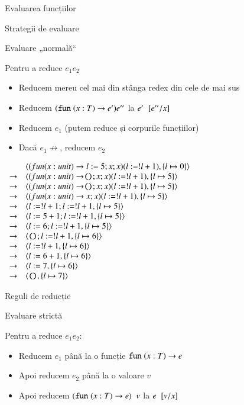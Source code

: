 \documentclass[xcolor=pdftex,romanian,colorlinks]{beamer}
\begin{document}
\begin{section}{Evaluarea funcțiilor}
\begin{subsection}{Strategii de evaluare}
\begin{frame}{Evaluare „normală“}
\begin{block}{}
Pentru a reduce $e_1 \mathrel{} e_2$
\begin{itemize}
\item Reducem mereu cel mai din stânga redex din cele de mai sus
\item Reducem $(\mathrel{\text{\ttfamily fun}} (x : T) \rightarrow e') e''$ la $e'\mathrel{}[e''/x]$
\item Reducem $e_1$ (putem reduce și corpurile funcțiilor)
\item Dacă $e_1\not\rightarrow$, reducem $e_2$
\end{itemize} 
\end{block}

\hfill {\small$\begin{array}{ll}
& {\langle{(fun (x : unit) \rightarrow l := 5 ; x ; x) (l := !l + 1), \{l \mapsto 0\}}\rangle} \\
\rightarrow& {\langle{(fun (x : unit) \rightarrow \ensuremath\mathrel{\text{\ttfamily ()}}; x ; x) (l := !l + 1), \{l \mapsto 5\}}\rangle} \\
\rightarrow& {\langle{(fun (x : unit) \rightarrow \ensuremath\mathrel{\text{\ttfamily ()}}; x ; x) (l := !l + 1), \{l \mapsto 5\}}\rangle} \\
\rightarrow& {\langle{(fun (x : unit) \rightarrow x ; x) (l := !l + 1), \{l \mapsto 5\}}\rangle} \\
\rightarrow& {\langle{l := !l + 1 ; l := !l + 1, \{l \mapsto 5\}}\rangle} \\
\rightarrow& {\langle{l := 5 + 1 ; l := !l + 1, \{l \mapsto 5\}}\rangle} \\
\rightarrow& {\langle{l := 6 ; l := !l + 1, \{l \mapsto 5\}}\rangle} \\
\rightarrow& {\langle{\ensuremath\mathrel{\text{\ttfamily ()}}; l := !l + 1, \{l \mapsto 6\}}\rangle} \\
\rightarrow& {\langle{l := !l + 1, \{l \mapsto 6\}}\rangle} \\
\rightarrow& {\langle{l := 6 + 1, \{l \mapsto 6\}}\rangle} \\
\rightarrow& {\langle{l := 7, \{l \mapsto 6\}}\rangle} \\
\rightarrow& {\langle{\ensuremath\mathrel{\text{\ttfamily ()}}, \{l \mapsto 7\}}\rangle}
\end{array}$} \hfill\;
\end{frame}


\end{subsection}

\begin{subsection}{Reguli de reducție}


\begin{frame}{Evaluare strictă}
\begin{block}{}
Pentru a reduce $e_1 \mathrel{} e_2$:
\begin{itemize}
\item  Reducem $e_1$ până la o funcție
$\mathrel{\text{\ttfamily fun}} (x : T) \rightarrow e$
\item Apoi reducem $e_2$ până la o valoare $v$
\item Apoi reducem $(\mathrel{\text{\ttfamily fun}} (x : T) \rightarrow e)\mathrel{}v$ la $e\mathrel{}[v/x]$
\end{itemize}
\end{block}


\end{frame}
\end{subsection}
\end{section}
\end{document}
